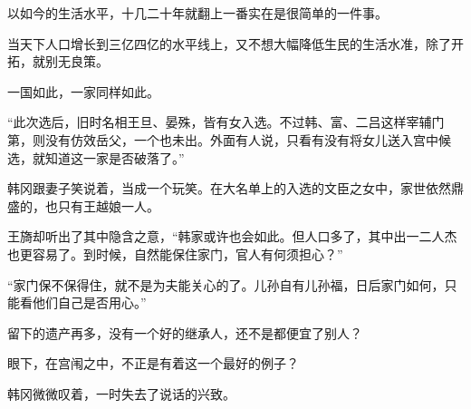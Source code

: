以如今的生活水平，十几二十年就翻上一番实在是很简单的一件事。

当天下人口增长到三亿四亿的水平线上，又不想大幅降低生民的生活水准，除了开拓，就别无良策。

一国如此，一家同样如此。

“此次选后，旧时名相王旦、晏殊，皆有女入选。不过韩、富、二吕这样宰辅门第，则没有仿效岳父，一个也未出。外面有人说，只看有没有将女儿送入宫中候选，就知道这一家是否破落了。”

韩冈跟妻子笑说着，当成一个玩笑。在大名单上的入选的文臣之女中，家世依然鼎盛的，也只有王越娘一人。

王旖却听出了其中隐含之意，“韩家或许也会如此。但人口多了，其中出一二人杰也更容易了。到时候，自然能保住家门，官人有何须担心？”

“家门保不保得住，就不是为夫能关心的了。儿孙自有儿孙福，日后家门如何，只能看他们自己是否用心。”

留下的遗产再多，没有一个好的继承人，还不是都便宜了别人？

眼下，在宫闱之中，不正是有着这一个最好的例子？

韩冈微微叹着，一时失去了说话的兴致。
